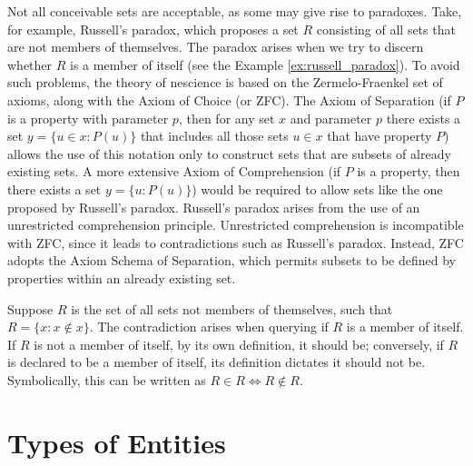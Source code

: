 Not all conceivable sets are acceptable, as some may give rise to paradoxes. Take, for example, Russell's paradox, which proposes a set $R$ consisting of all sets that are not members of themselves. The paradox arises when we try to discern whether $R$ is a member of itself (see the Example \ref{ex:russell_paradox}). To avoid such problems, the theory of nescience is based on the Zermelo-Fraenkel set of axioms, along with the Axiom of Choice (or ZFC). The Axiom of Separation (if $P$ is a property with parameter $p$, then for any set $x$ and parameter $p$ there exists a set $y=\{u \in x : P(u) \}$ that includes all those sets $u \in x$ that have property $P$) allows the use of this notation only to construct sets that are subsets of already existing sets. A more extensive Axiom of Comprehension (if $P$ is a property, then there exists a set $y=\{u : P(u) \}$) would be required to allow sets like the one proposed by Russell's paradox. Russell's paradox arises from the use of an unrestricted comprehension principle. Unrestricted comprehension is incompatible with ZFC, since it leads to contradictions such as Russell's paradox. Instead, ZFC adopts the Axiom Schema of Separation, which permits subsets to be defined by properties within an already existing set.

\begin{example}
\label{ex:russell_paradox}
Suppose $R$ is the set of all sets not members of themselves, such that $R = \{ x : x \notin x \}$. The contradiction arises when querying if $R$ is a member of itself. If $R$ is not a member of itself, by its own definition, it should be; conversely, if $R$ is declared to be a member of itself, its definition dictates it should not be. Symbolically, this can be written as $R \in R \Leftrightarrow R \notin R$.
\end{example}

%
%

\section{Types of Entities}
\label{sec:types_of_entities}


